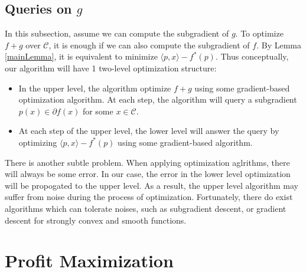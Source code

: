 \documentclass{article}
\begin{document}
\subsection{Queries on $g$}
In this subsection, assume we can compute the subgradient of $g$. To optimize $f+g$ over $\mathcal{C}$, it is enough if we can also compute the subgradient of $f$. By Lemma \ref{mainLemma}, it is equivalent to minimize $\langle p,x\rangle-f^*(p)$. Thus conceptually, our algorithm will have 1 two-level optimization structure:
\begin{itemize}
    \item In the upper level, the algorithm optimize $f+g$ using some gradient-based optimization algorithm. At each step, the algorithm will query a subgradient $p(x)\in\partial f(x)$ for some $x\in \mathcal{C}$.
    \item At each step of the upper level, the lower level will answer the query by optimizing $\langle p,x\rangle-f^*(p)$ using some gradient-based algorithm.
\end{itemize}
There is another subtle problem. When applying optimization aglrithms, there will always be some error. In our case, the error in the lower level optimization will be propogated to the upper level. As a result, the upper level algorithm may suffer from noise during the process of optimization. Fortunately, there do exist algorithms which can tolerate noises, such as subgradient descent, or gradient descent for strongly convex and smooth functions.

\section{Profit Maximization}




\end{document}
